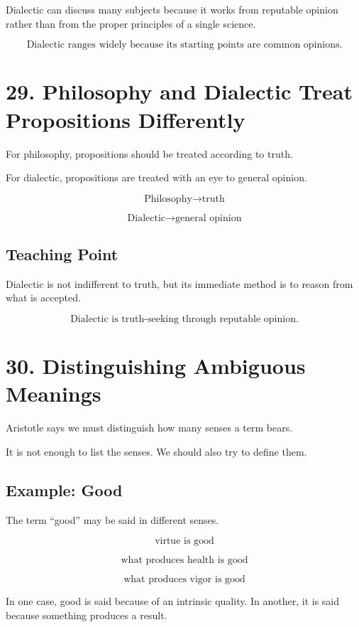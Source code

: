 \documentclass[12pt]{article}
\begin{document}
Dialectic can discuss many subjects because it works from reputable opinion
rather than from the proper principles of a single science.

\[
\boxed{
\text{Dialectic ranges widely because its starting points are common opinions.}
}
\]

\section*{29. Philosophy and Dialectic Treat Propositions Differently}

For philosophy, propositions should be treated according to truth.

For dialectic, propositions are treated with an eye to general opinion.

\[
\text{Philosophy} \rightarrow \text{truth}
\]

\[
\text{Dialectic} \rightarrow \text{general opinion}
\]

\subsection*{Teaching Point}

Dialectic is not indifferent to truth, but its immediate method is to reason
from what is accepted.

\[
\boxed{
\text{Dialectic is truth-seeking through reputable opinion.}
}
\]

\section*{30. Distinguishing Ambiguous Meanings}

Aristotle says we must distinguish how many senses a term bears.

It is not enough to list the senses. We should also try to define them.

\subsection*{Example: Good}

The term ``good'' may be said in different senses.

\[
\text{virtue is good}
\]

\[
\text{what produces health is good}
\]

\[
\text{what produces vigor is good}
\]

In one case, good is said because of an intrinsic quality. In another, it is
said because something produces a result.
\end{document}
